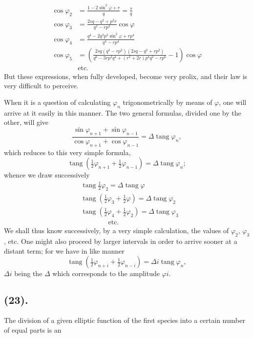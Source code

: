\documentclass{article}
\begin{document}
\[ \begin{aligned} \cos\varphi_{2} &= \frac{1-2\sin^{2}\varphi+r}{q}=\frac{s}{q} \\ \cos\varphi_{3} &= \frac{2sq-q^{2}+p^{2}r}{q^{2}-rp^{2}}\cos\varphi \\ \cos\varphi_{4} &= \frac{q^{4}-2q^{2}p^{2}\sin^{2}\varphi+rp^{4}}{q^{4}-rp^{4}} \\ \cos\varphi_{5} &= \left(\frac{2sq(q^{2}-rp^{2})(2sq-q^{2}+rp^{2})}{q^{6}-3rp^{2}q^{4}+(r^{2}+2r)p^{4}q^{2}-rp^{6}}-1\right)\cos\varphi \\ &\text{etc.} \end{aligned} \]
But these expressions, when fully developed, become very prolix, and their law is very difficult to perceive.

When it is a question of calculating $\varphi_{n}$ trigonometrically by means of $\varphi$, one will arrive at it easily in this manner. The two general formulas, divided one by the other, will give
\[ \frac{\sin\varphi_{n+1}+\sin\varphi_{n-1}}{\cos\varphi_{n+1}+\cos\varphi_{n-1}}=\Delta\operatorname{tang}\varphi_{n}, \]
which reduces to this very simple formula,
\[ \operatorname{tang}(\tfrac{1}{2}\varphi_{n+1}+\tfrac{1}{2}\varphi_{n-1})=\Delta\operatorname{tang}\varphi_{n}; \]
whence we draw successively
\[ \begin{aligned} &\operatorname{tang}\tfrac{1}{2}\varphi_{2}=\Delta\operatorname{tang}\varphi \\ &\operatorname{tang}(\tfrac{1}{2}\varphi_{3}+\tfrac{1}{2}\varphi)=\Delta\operatorname{tang}\varphi_{2} \\ &\operatorname{tang}(\tfrac{1}{2}\varphi_{4}+\tfrac{1}{2}\varphi_{2})=\Delta\operatorname{tang}\varphi_{3} \\ &\qquad\qquad\text{etc.} \end{aligned} \]
We shall thus know successively, by a very simple calculation, the values of $\varphi_{2}$, $\varphi_{3}$, etc. One might also proceed by larger intervals in order to arrive sooner at a distant term; for we have in like manner
\[ \operatorname{tang}(\tfrac{1}{2}\varphi_{n+i}+\tfrac{1}{2}\varphi_{n-i})=\Delta i\operatorname{tang}\varphi_{n}, \]
$\Delta i$ being the $\Delta$ which corresponds to the amplitude $\varphi i$.

\subsection*{(23).}

The division of a given elliptic function of the first species into a certain number of equal parts is an
\end{document}
